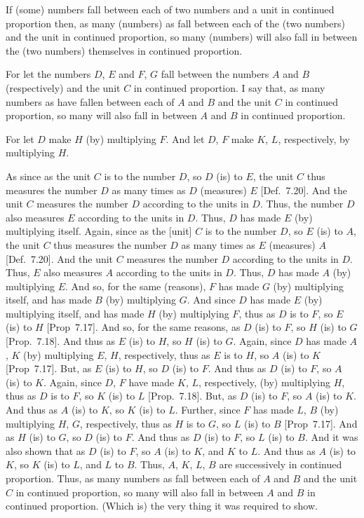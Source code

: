 \begin{Parallel}{}{}
{If (some) numbers fall between each of two numbers and a unit in continued proportion then, as many (numbers)
as fall between each of the (two numbers) and the unit in continued proportion, so many (numbers)  will also fall in between the (two numbers) themselves in continued proportion.

For let the numbers $D$, $E$ and $F$, $G$ fall between the numbers $A$ and $B$ (respectively) and the unit $C$ in continued proportion. I say that,
as many numbers as have fallen between each of $A$ and $B$ and the unit $C$ in continued proportion,
so many will also fall in between $A$ and $B$ in continued proportion.\\

\epsfysize=1.8in
\centerline{}

For let $D$ make $H$ (by) multiplying $F$. And let  $D$, $F$
make $K$, $L$, respectively, by multiplying $H$.

As since as the unit $C$  is to the number $D$, so $D$ (is) to $E$, the unit
$C$ thus measures the number $D$ as many times as $D$ (measures) $E$
[Def.~7.20]. And the unit $C$ measures the
number $D$ according to the units in $D$. Thus, the number $D$
also measures $E$ according to the units in $D$. Thus, $D$ has made $E$
(by) multiplying itself. Again, since as the [unit] $C$ is to
the number $D$, so $E$ (is) to $A$, the unit $C$ thus measures the number
$D$ as many times as $E$ (measures) $A$ [Def.~7.20].
  And the unit $C$ measures the number $D$ according to the units in $D$.
  Thus, $E$ also measures $A$ according to the units  in $D$. Thus, $D$
  has made $A$ (by) multiplying $E$. And so, for the same (reasons), 
  $F$ has made $G$ (by) multiplying itself, and has made $B$ (by)
  multiplying $G$. And since $D$ has made $E$ (by) multiplying itself,
  and has made $H$ (by) multiplying $F$, thus as $D$ is to $F$, so
  $E$ (is) to $H$ [Prop~7.17]. And so, for the
  same reasons, as $D$ (is) to $F$, so $H$ (is) to $G$ [Prop.~7.18].  And thus as $E$ (is) to $H$, so $H$
  (is) to $G$. Again, since $D$ has made  $A$, $K$ (by)
  multiplying $E$, $H$, respectively, thus as $E$ is to $H$, so $A$ (is)
  to $K$ [Prop~7.17]. But, as $E$ (is) to $H$,
  so $D$ (is) to $F$. And thus as $D$ (is) to $F$, so $A$ (is) to $K$.
  Again, since  $D$, $F$ have made  $K$, $L$, respectively, (by) multiplying $H$, thus as $D$ is to $F$, so $K$ (is) to $L$ [Prop.~7.18]. But, as $D$ (is) to $F$, so $A$ (is)
  to $K$.  And thus as $A$ (is) to $K$, so $K$ (is) to $L$.
   Further, since $F$ has made  $L$, $B$ (by) multiplying
   $H$, $G$, respectively, thus as $H$ is to $G$, so $L$ (is) to $B$  [Prop~7.17]. And as $H$ (is) to $G$, so $D$ (is) to $F$. And thus as $D$ 
  (is) to $F$, so $L$ (is) to $B$. And it was also
  shown that as $D$ (is) to $F$, so $A$ (is) to $K$, and $K$ to $L$.
  And thus as $A$ (is) to $K$, so $K$ (is) to $L$, and $L$ to $B$.
  Thus, $A$, $K$, $L$, $B$ are  successively in continued proportion.
  Thus, as many numbers as fall between each of $A$ and $B$ and the unit $C$ in continued proportion, so many will also fall in between $A$ and $B$
  in continued proportion. (Which is) the very thing it was required to show.}
\end{Parallel}

